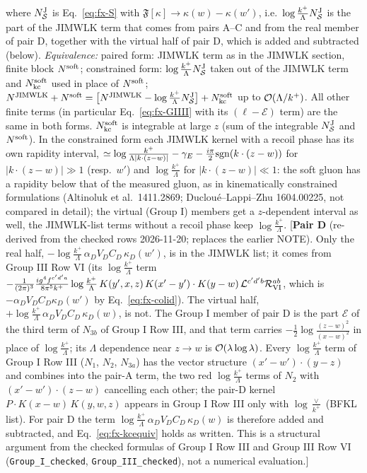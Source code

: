 \documentclass[9pt]{article}
\numberwithin{equation}{section}
\begin{document}
{where $N^{\rm J}_{\mathcal{S}}$ is Eq.~\eqref{eq:fx-S} with $\mathfrak{F}[\kappa]\to\kappa(w)-\kappa(w')$, i.e.\ $\log\frac{k^{+}}{\Lambda}N^{\rm J}_{\mathcal{S}}$ is the part of the JIMWLK term that comes from pairs A--C and from the real member of pair D, together with the virtual half of pair D, which is added and subtracted (below). \emph{Equivalence:} paired form: JIMWLK term as in the JIMWLK section, finite block $N^{\rm soft}$; constrained form: $\log\frac{k^{+}}{\Lambda}N^{\rm J}_{\mathcal{S}}$ taken out of the JIMWLK term and $N^{\rm soft}_{\rm kc}$ used in place of $N^{\rm soft}$; $N^{\rm JIMWLK}+N^{\rm soft}=\big[N^{\rm JIMWLK}-\log\frac{k^{+}}{\Lambda}N^{\rm J}_{\mathcal{S}}\big]+N^{\rm soft}_{\rm kc}$ up to ${\cal O}(\Lambda/k^{+})$. All other finite terms (in particular Eq.~\eqref{eq:fx-GIIII} with its $(\ell-\mathcal{E})$ term) are the same in both forms. $N^{\rm soft}_{\rm kc}$ is integrable at large $z$ (sum of the integrable $N^{\rm J}_{\mathcal{S}}$ and $N^{\rm soft}$). In the constrained form each JIMWLK kernel with a recoil phase has its own rapidity interval, $\simeq\log\frac{k^{+}}{\Lambda|k\cdot(z-w)|}-\gamma_{E}-\frac{i\pi}{2}{\rm sgn}(k\cdot(z-w))$ for $|k\cdot(z-w)|\gg1$ (resp.\ $w'$) and $\log\frac{k^{+}}{\Lambda}$ for $|k\cdot(z-w)|\ll1$: the soft gluon has a rapidity below that of the measured gluon, as in kinematically constrained formulations (Altinoluk et al.\ 1411.2869; Ducloué--Lappi--Zhu 1604.00225, not compared in detail); the virtual (Group I) members get a $z$-dependent interval as well, the JIMWLK-list terms without a recoil phase keep $\log\frac{k^{+}}{\Lambda}$. [\textbf{Pair D} (re-derived from the checked rows 2026-11-20; replaces the earlier NOTE). Only the real half, $-\log\frac{k^{+}}{\Lambda}\,\alpha_{D}V_{D}C_{D}\,\kappa_{D}(w')$, is in the JIMWLK list; it comes from Group III Row VI (its $\log\frac{k^{+}}{\Lambda}$ term $-\frac{1}{(2\pi)^{3}}\frac{ig^{4}f^{c'd'a}}{8\pi^{5}k^{+}}\log\frac{k^{+}}{\Lambda}\,K(y',x,z)\,K(x'-y')\cdot K(y-w)\,\mathcal{L}^{c'd'b}\mathcal{R}_{\rm VI}^{ab}$, which is $-\alpha_{D}V_{D}C_{D}\kappa_{D}(w')$ by Eq.~\eqref{eq:fx-colid}). The virtual half, $+\log\frac{k^{+}}{\Lambda}\,\alpha_{D}V_{D}C_{D}\,\kappa_{D}(w)$, is not. The Group I member of pair D is the part $\mathcal{E}$ of the third term of $N_{3b}$ of Group I Row III, and that term carries $-\frac12\log\frac{(z-w)^{2}}{(x-w)^{2}}$ in place of $\log\frac{k^{+}}{\Lambda}$; its $\Lambda$ dependence near $z\to w$ is ${\cal O}(\lambda\log\lambda)$. Every $\log\frac{k^{+}}{\Lambda}$ term of Group I Row III ($N_{1}$, $N_{2}$, $N_{3a}$) has the vector structure $(x'-w')\cdot(y-z)$ and combines into the pair-A term, the two red $\log\frac{k^{+}}{\Lambda}$ terms of $N_{2}$ with $(x'-w')\cdot(z-w)$ cancelling each other; the pair-D kernel $P\cdot K(x-w)\,K(y,w,z)$ appears in Group I Row III only with $\log\frac{\vee}{k^{+}}$ (BFKL list). For pair D the term $\log\frac{k^{+}}{\Lambda}\,\alpha_{D}V_{D}C_{D}\,\kappa_{D}(w)$ is therefore added and subtracted, and Eq.~\eqref{eq:fx-kcequiv} holds as written. This is a structural argument from the checked formulas of Group I Row III and Group III Row VI (\texttt{Group\_I\_checked}, \texttt{Group\_III\_checked}), not a numerical evaluation.]

}
\end{document}
